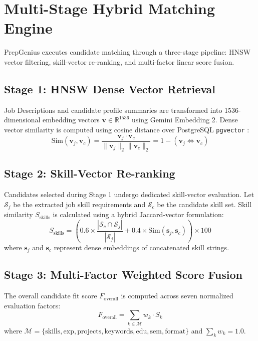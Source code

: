 \documentclass[conference]{IEEEtran}
\begin{document}
\section{Multi-Stage Hybrid Matching Engine}
PrepGenius executes candidate matching through a three-stage pipeline: HNSW vector filtering, skill-vector re-ranking, and multi-factor linear score fusion.

\subsection{Stage 1: HNSW Dense Vector Retrieval}
Job Descriptions and candidate profile summaries are transformed into 1536-dimensional embedding vectors $\mathbf{v} \in \mathbb{R}^{1536}$ using Gemini Embedding 2. Dense vector similarity is computed using cosine distance over PostgreSQL \texttt{pgvector} \cite{b4}:
\begin{equation}
\text{Sim}(\mathbf{v}_j, \mathbf{v}_c) = \frac{\mathbf{v}_j \cdot \mathbf{v}_c}{\|\mathbf{v}_j\|_2 \|\mathbf{v}_c\|_2} = 1 - (\mathbf{v}_j \Leftrightarrow \mathbf{v}_c)
\end{equation}

\subsection{Stage 2: Skill-Vector Re-ranking}
Candidates selected during Stage 1 undergo dedicated skill-vector evaluation. Let $\mathcal{S}_j$ be the extracted job skill requirements and $\mathcal{S}_c$ be the candidate skill set. Skill similarity $S_{\text{skills}}$ is calculated using a hybrid Jaccard-vector formulation:
\begin{equation}
S_{\text{skills}} = \left( 0.6 \times \frac{|\mathcal{S}_c \cap \mathcal{S}_j|}{|\mathcal{S}_j|} + 0.4 \times \text{Sim}(\mathbf{s}_j, \mathbf{s}_c) \right) \times 100
\end{equation}
where $\mathbf{s}_j$ and $\mathbf{s}_c$ represent dense embeddings of concatenated skill strings.

\subsection{Stage 3: Multi-Factor Weighted Score Fusion}
The overall candidate fit score $F_{\text{overall}}$ is computed across seven normalized evaluation factors:
\begin{equation}
F_{\text{overall}} = \sum_{k \in \mathcal{M}} w_k \cdot S_k
\end{equation}
where $\mathcal{M} = \{\text{skills}, \text{exp}, \text{projects}, \text{keywords}, \text{edu}, \text{sem}, \text{format}\}$ and $\sum_{k} w_k = 1.0$.
\end{document}
